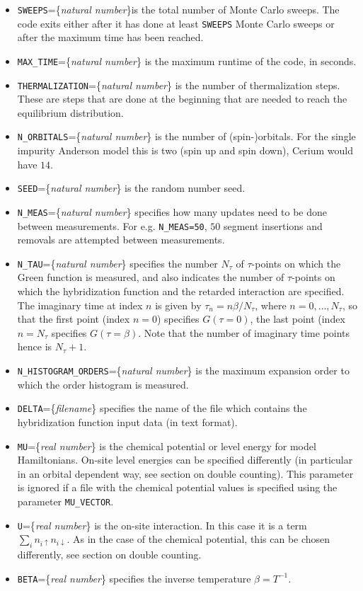 \documentclass[aps,prb,floatfix,superscriptaddress,twocolumn,notitlepage]{revtex4-1}
\begin{document}
\begin{itemize}
\item \verb#SWEEPS#=\{\emph{natural number}\}is the total number of Monte Carlo sweeps. The code exits either after it has done at least \verb#SWEEPS# Monte Carlo sweeps or after the maximum time has been reached.
\item \verb#MAX_TIME#=\{\emph{natural number}\} is the maximum runtime of the code, in seconds.
\item \verb#THERMALIZATION#=\{\emph{natural number}\} is the number of thermalization steps. These are steps that are done at the beginning that are needed to reach the equilibrium distribution.
\item \verb#N_ORBITALS#=\{\emph{natural number}\} is the number of (spin-)orbitals. For the single impurity Anderson model this is two (spin up and spin down), Cerium would have $14$.
\item \verb#SEED#=\{\emph{natural number}\} is the random number seed. 
\item \verb#N_MEAS#=\{\emph{natural number}\} specifies how many updates need to be done between measurements. For e.g. \verb#N_MEAS=50#, $50$ segment insertions and removals are attempted between measurements.
\item \verb#N_TAU#=\{\emph{natural number}\} specifies the number $N_{\tau}$ of $\tau$-points on which the Green function is measured, and also indicates the number of $\tau$-points on which the hybridization function and the retarded interaction are specified. The imaginary time at index $n$ is given by $\tau_{n}=n\beta/N_{\tau}$, where $n=0,\ldots,N_{\tau}$, so that the first point (index $n=0$) specifies $G(\tau=0)$, the last point (index $n=N_{\tau}$ specifies $G(\tau=\beta)$. Note that the number of imaginary time points hence is $N_{\tau}+1$.
\item \verb#N_HISTOGRAM_ORDERS#=\{\emph{natural number}\} is the maximum expansion order to which the order histogram is measured. 
\item \verb#DELTA#=\{\emph{filename}\} specifies the name of the file which contains the hybridization function input data (in text format).
\item \verb#MU#=\{\emph{real number}\} is the chemical potential or level energy for model Hamiltonians. On-site level energies can be specified differently (in particular in an orbital dependent way, see section on double counting). This parameter is ignored if a file with the chemical potential values is specified using the parameter \verb#MU_VECTOR#.
\item \verb#U#=\{\emph{real number}\} is the on-site interaction. In this case it is a term $\sum_i n_{i\uparrow}n_{i\downarrow}$. As in the case of the chemical potential, this can be chosen differently, see section on double counting.
\item \verb#BETA#=\{\emph{real number}\} specifies the inverse temperature $\beta=T^{-1}$.
\end{itemize}
\end{document}
